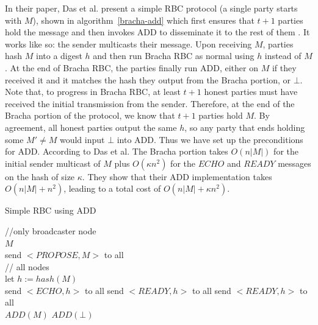 \documentclass{article}
\begin{document}
In their paper, Das et al. present a simple RBC protocol (a single party starts with $M$), shown in algorithm~\ref{bracha-add} which first ensures that $t+1$ parties hold the message and then invokes ADD to disseminate it to the rest of them \cite{das2021add}. It works like so: the sender multicasts their message. Upon receiving $M$, parties hash $M$ into a digest $h$ and then run Bracha RBC as normal using $h$ instead of $M$. At the end of Bracha RBC, the parties finally run ADD, either on $M$ if they received it and it matches the hash they output from the Bracha portion, or $\bot$. Note that, to progress in Bracha RBC, at least $t+1$ honest parties must have received the initial transmission from the sender. Therefore, at the end of the Bracha portion of the protocol, we know that $t+1$ parties hold $M$. By agreement, all honest parties output the same $h$, so any party that ends holding some $M' \neq M$ would input $\bot$ into ADD. Thus we have set up the preconditions for ADD. According to Das et al. The Bracha portion takes $O(n|M|)$ for the initial sender multicast of $M$ plus $O(\kappa n^2)$ for the $ECHO$ and $READY$ messages on the hash of size $\kappa$. They show that their ADD implementation takes $O(n|M| + n^2)$, leading to a total cost of $O(n|M| + \kappa n^2)$.

\begin{algorithm}\label{bracha-add}
\caption{Simple RBC using ADD \cite{das2021add}}



//only broadcaster node\\
\Input $M$\\
send $<PROPOSE, M>$ to all\\
// all nodes\\
{
	let $h := hash(M)$\\
	send $<ECHO, h>$ to all
}
{
	send $<READY, h>$ to all
}
{
	send $<READY, h>$ to all\\
}
{
	{
		$ADD(M)$
	}
	\Else
	{
		$ADD(\bot)$
	}
}
\SetAlgoLined
\SetAlgoNoEnd
\end{algorithm}
\end{document}
